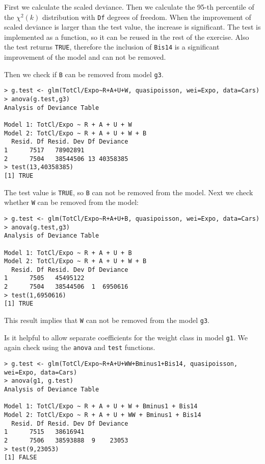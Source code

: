 \documentclass[11pt]{article}
\begin{document}
First we calculate the scaled deviance. Then we calculate the 95-th percentile of the $\chi^{2}(k)$ distribution with \verb|Df| degrees of freedom. When the improvement of scaled deviance is larger than the test value, the increase is significant. The test is implemented as a function, so it can be reused in the rest of the exercise. Also the test returns \verb|TRUE|, therefore the inclusion of \verb|Bis14| is a significant improvement of the model and can not be removed.

Then we check if \verb|B| can be removed from model \verb|g3|.

\begin{verbatim}
> g.test <- glm(TotCl/Expo~R+A+U+W, quasipoisson, wei=Expo, data=Cars)
> anova(g.test,g3)
Analysis of Deviance Table

Model 1: TotCl/Expo ~ R + A + U + W
Model 2: TotCl/Expo ~ R + A + U + W + B
  Resid. Df Resid. Dev Df Deviance
1      7517   78902891            
2      7504   38544506 13 40358385
> test(13,40358385)
[1] TRUE
\end{verbatim}

The test value is \verb|TRUE|, so \verb|B| can not be removed from the model. Next we check whether \verb|W| can be removed from the model:

\begin{verbatim}
> g.test <- glm(TotCl/Expo~R+A+U+B, quasipoisson, wei=Expo, data=Cars)
> anova(g.test,g3)
Analysis of Deviance Table

Model 1: TotCl/Expo ~ R + A + U + B
Model 2: TotCl/Expo ~ R + A + U + W + B
  Resid. Df Resid. Dev Df Deviance
1      7505   45495122            
2      7504   38544506  1  6950616
> test(1,6950616)
[1] TRUE
\end{verbatim}

This result implies that \verb|W| can not be removed from the model \verb|g3|.

Is it helpful to allow separate coefficients for the weight class in model \verb|g1|. We again check using the \verb|anova| and \verb|test| functions.

\begin{verbatim}
> g.test <- glm(TotCl/Expo~R+A+U+WW+Bminus1+Bis14, quasipoisson, wei=Expo, data=Cars)
> anova(g1, g.test)
Analysis of Deviance Table

Model 1: TotCl/Expo ~ R + A + U + W + Bminus1 + Bis14
Model 2: TotCl/Expo ~ R + A + U + WW + Bminus1 + Bis14
  Resid. Df Resid. Dev Df Deviance
1      7515   38616941            
2      7506   38593888  9    23053
> test(9,23053)
[1] FALSE
\end{verbatim}
\end{document}
